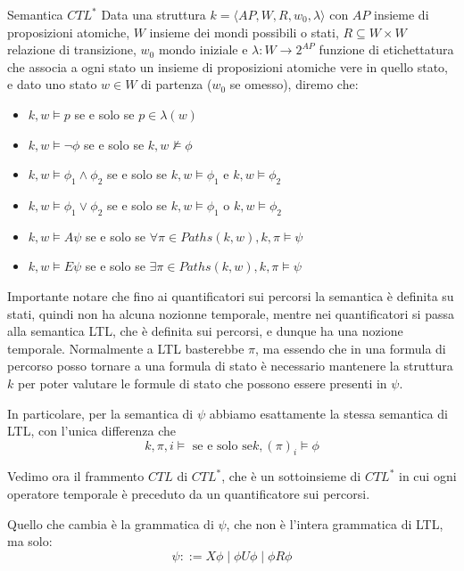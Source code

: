 \begin{definition}{Semantica \(CTL^*\)}
  Data una struttura \(k = \langle AP, W, R, w_0, \lambda \rangle\) con \(AP\) insieme di proposizioni atomiche, \(W\) insieme dei mondi possibili o stati, \(R \subseteq W\times W\) relazione di transizione, \(w_0\) mondo iniziale e \(\lambda: W \to 2^{AP}\) funzione di etichettatura che associa a ogni stato un insieme di proposizioni atomiche vere in quello stato, e dato uno stato \(w \in W\) di partenza (\(w_0\) se omesso), diremo che:
  \begin{itemize}
    \item \(k,w \models p\) se e solo se \(p \in \lambda(w)\)
    \item \(k,w \models \neg \phi\) se e solo se \(k,w \not\models \phi\)
    \item \(k,w \models \phi_1 \land \phi_2\) se e solo se \(k,w \models \phi_1\) e \(k,w \models \phi_2\)
    \item \(k,w \models \phi_1 \lor \phi_2\) se e solo se \(k,w \models \phi_1\) o \(k,w \models \phi_2\)
    \item \(k,w \models A\psi\) se e solo se \(\forall \pi \in Paths(k,w), k,\pi \models \psi\)
    \item \(k,w \models E\psi\) se e solo se \(\exists \pi \in Paths(k,w), k,\pi \models \psi\)
  \end{itemize}
  Importante notare che fino ai quantificatori sui percorsi la semantica è definita su stati, quindi non ha alcuna nozionne temporale, mentre nei quantificatori si passa alla semantica LTL\@, che è definita sui percorsi, e dunque ha una nozione temporale. Normalmente a LTL basterebbe \(\pi\), ma essendo che in una formula di percorso posso tornare a una formula di stato è necessario mantenere la struttura \(k\) per poter valutare le formule di stato che possono essere presenti in \(\psi\).

  In particolare, per la semantica di \(\psi\) abbiamo esattamente la stessa semantica di LTL\@, con l'unica differenza che
  \[k, \pi, i\models \text{ se e solo se} k,{(\pi)}_i\models \phi\]
\end{definition}

Vedimo ora il frammento \(CTL\) di \(CTL^*\), che è un sottoinsieme di \(CTL^*\) in cui ogni operatore temporale è preceduto da un quantificatore sui percorsi.

Quello che cambia è la grammatica di \(\psi\), che non è l'intera grammatica di LTL\@, ma solo:
\[\psi ::= X\phi \mid \phi U\phi \mid \phi R\phi\]

